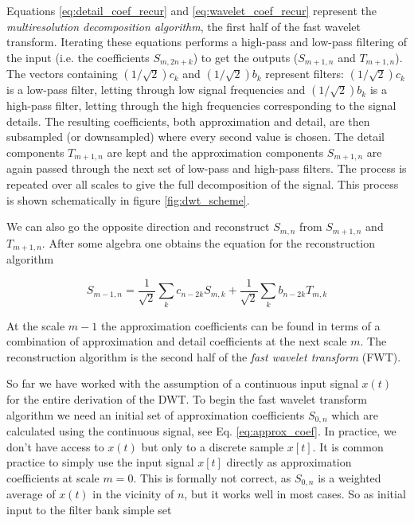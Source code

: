 Equations \ref{eq:detail_coef_recur} and \ref{eq:wavelet_coef_recur} represent the \textit{multiresolution decomposition algorithm}, the first half of the fast 
wavelet transform. Iterating these equations performs a high-pass and low-pass filtering of the input (i.e. the coefficients $S_{m, 2n+k}$) to get the outputs
($S_{m+1, n}$ and $T_{m+1, n}$). The vectors containing $(1/\sqrt{2})c_k$ and $(1/\sqrt{2})b_k$ represent filters: $(1/\sqrt{2})c_k$ is a low-pass filter, letting
through low signal frequencies and $(1/\sqrt{2})b_k$ is a high-pass filter, letting through the high frequencies corresponding to the signal details.
The resulting coefficients, both approximation and detail, are then subsampled (or downsampled) where every second value is chosen. The detail components
$T_{m+1, n}$ are kept and the approximation components $S_{m+1, n}$ are again passed through the next set of low-pass and high-pass filters.
The process is repeated over all scales to give the full decomposition of the signal. This process is shown schematically in figure \ref{fig:dwt_scheme}.




We can also go the opposite direction and reconstruct $S_{m,n}$ from $S_{m+1, n}$ and $T_{m+1, n}$. After some algebra one obtains 
the equation for the reconstruction algorithm

\begin{equation}
    S_{m-1, n} = \frac{1}{\sqrt{2}} \sum_k c_{n-2k} S_{m,k} + \frac{1}{\sqrt{2}} \sum_k b_{n-2k} T_{m, k}
\end{equation}

At the scale $m-1$ the approximation coefficients can be found in terms of a combination of approximation and detail coefficients at the next scale $m$. The 
reconstruction algorithm is the second half of the \textit{fast wavelet transform} (FWT). 

So far we have worked with the assumption of a continuous input signal $x(t)$ for the entire derivation of the DWT. To begin the fast wavelet transform algorithm
we need an initial set of approximation coefficients $S_{0, n}$ which are calculated using the continuous signal, see Eq. \ref{eq:approx_coef}. In practice, we don't
have access to $x(t)$ but only to a discrete sample $x[t]$. It is common practice to simply use the input signal $x[t]$ directly as approximation coefficients at 
scale $m=0$. This is formally not correct, as $S_{0,n}$ is a weighted average of $x(t)$ in the vicinity of $n$, but it works well in most cases. So as initial input 
to the filter bank simple set

